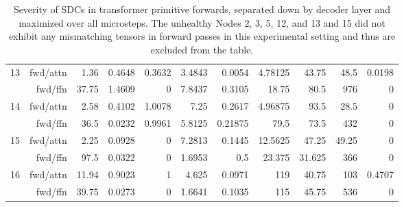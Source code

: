 \begin{table*}[t]
\begin{center}
\begin{tiny}
\begin{sc}
\begin{tabular}{rrrrrrrrrrr}
\midrule
\multirow{2}{*}{13}                   & fwd/attn             & 1.36  & 0.4648 & 0.3632 & 3.4843  & 0.0054  & 4.78125    & 43.75   & 48.5   & 0.0198 \\
                     & fwd/ffn              & 37.75 & 1.4609 & 0      & 7.8437  & 0.3105  & 18.75      & 80.5    & 976    & 0      \\
\midrule
\multirow{2}{*}{14}                    & fwd/attn             & 2.58  & 0.4102 & 1.0078 & 7.25    & 0.2617  & 4.96875    & 93.5    & 28.5   & 0      \\
                     & fwd/ffn              & 36.5  & 0.0232 & 0.9961 & 5.8125  & 0.21875 & 79.5       & 73.5    & 432    & 0      \\
\midrule
\multirow{2}{*}{15}                    & fwd/attn             & 2.25  & 0.0928 & 0      & 7.2813  & 0.1445  & 12.5625    & 47.25   & 49.25  & 0      \\
                     & fwd/ffn              & 97.5  & 0.0322 & 0      & 1.6953  & 0.5     & 23.375     & 31.625  & 366    & 0      \\
\midrule
\multirow{2}{*}{16}                    & fwd/attn             & 11.94 & 0.9023 & 1      & 4.625   & 0.0971  & 119        & 40.75   & 103    & 0.4707 \\
                     & fwd/ffn              & 39.75 & 0.0273 & 0      & 1.6641  & 0.1035  & 115        & 45.75   & 536    & 0     \\
\bottomrule
\end{tabular}

\end{sc}
\end{tiny}
\end{center}
\vskip 0.15in

\caption{Severity of SDCs in transformer primitive forwards, separated down by decoder layer and maximized over all microsteps. The unhealthy Nodes 2, 3, 5, 12, and 13 and 15 did not exhibit any mismatching tensors in forward passes in this experimental setting and thus are excluded from the table.}

\label{fig:forward_primitive_max_severity}
\end{table*}